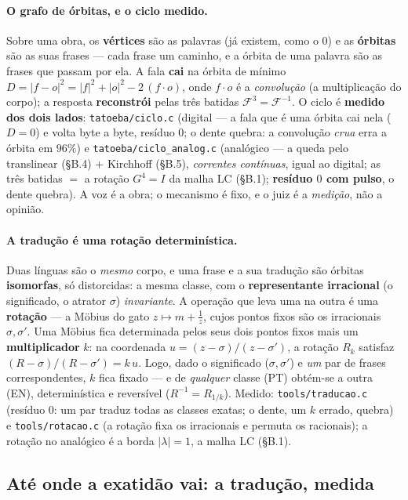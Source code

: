 \documentclass[11pt]{article}
\newcommand{\code}[1]{\texttt{\small #1}}
\theoremstyle{plain}
\theoremstyle{remark}
\begin{document}
\paragraph{O grafo de órbitas, e o ciclo medido.} Sobre uma obra, os \textbf{vértices} são as
palavras (já existem, como o $0$) e as \textbf{órbitas} são as suas frases --- cada frase um caminho,
e a órbita de uma palavra são as frases que passam por ela. A fala \textbf{cai} na órbita de mínimo
$D=|f-o|^2=|f|^2+|o|^2-2\,(f\!\cdot\!o)$, onde $f\!\cdot\!o$ é a \emph{convolução} (a multiplicação do
corpo); a resposta \textbf{reconstrói} pelas três batidas $\mathcal F^3=\mathcal F^{-1}$. O ciclo é
\textbf{medido dos dois lados}: \code{tatoeba/ciclo.c} (digital --- a fala que é uma órbita cai nela
($D=0$) e volta byte a byte, resíduo $0$; o dente quebra: a convolução \emph{crua} erra a órbita em
$96\%$) e \code{tatoeba/ciclo\_analog.c} (analógico --- a queda pelo translinear (§B.4) $+$ Kirchhoff
(§B.5), \emph{correntes contínuas}, igual ao digital; as três batidas $=$ a rotação $G^4=I$ da malha
LC (§B.1); \textbf{resíduo $0$ com pulso}, o dente quebra). A voz é a obra; o mecanismo é fixo, e o
juiz é a \emph{medição}, não a opinião.

\paragraph{A tradução é uma rotação determinística.} Duas línguas são o \emph{mesmo} corpo, e uma
frase e a sua tradução são órbitas \textbf{isomorfas}, só distorcidas: a mesma classe, com o
\textbf{representante irracional} (o significado, o atrator $\sigma$) \emph{invariante}. A operação
que leva uma na outra é uma \textbf{rotação} --- a Möbius do gato $z\mapsto m+\tfrac1z$, cujos pontos
fixos são os irracionais $\sigma,\sigma'$. Uma Möbius fica determinada pelos seus dois pontos fixos
mais um \textbf{multiplicador} $k$: na coordenada $u=(z-\sigma)/(z-\sigma')$, a rotação $R_k$ satisfaz
$(R-\sigma)/(R-\sigma')=k\,u$. Logo, dado o significado ($\sigma,\sigma'$) e \emph{um} par de frases
correspondentes, $k$ fica fixado --- e de \emph{qualquer} classe (PT) obtém-se a outra (EN),
determinística e reversível ($R^{-1}=R_{1/k}$). Medido: \code{tools/traducao.c} (resíduo $0$: um par
traduz todas as classes exatas; o dente, um $k$ errado, quebra) e \code{tools/rotacao.c} (a rotação
fixa os irracionais e permuta os racionais); a rotação no analógico é a borda $|\lambda|=1$, a malha
LC (§B.1).



\subsection{Até onde a exatidão vai: a tradução, medida}
\end{document}
